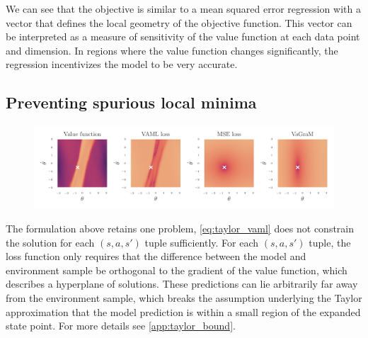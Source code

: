 We can see that the objective is similar to a mean squared error regression with a vector that defines the local geometry of the objective function. This vector can be interpreted as a measure of sensitivity of the value function at each data point and dimension. In regions where the value function changes significantly, the regression incentivizes the model to be very accurate. 

\subsection{Preventing spurious local minima}
\begin{figure}[!t]
\centering
    \includegraphics[clip, trim=0.cm 0.5cm 0.cm 0.45cm, width=\textwidth]{figures/vagram/all_losses.pdf}
    \caption{}
    \label{fig:all_losses}
\end{figure}


The formulation above retains one problem, \autoref{eq:taylor_vaml} does not constrain the solution for each $(s,a,s')$ tuple sufficiently.
For each $(s,a,s')$ tuple, the loss function only requires that the difference between the model and environment sample be orthogonal to the gradient of the value function, which describes a hyperplane of solutions.
These predictions can lie arbitrarily far away from the environment sample, which breaks the assumption underlying the Taylor approximation that the model prediction is within a small region of the expanded state point.
For more details see \autoref{app:taylor_bound}.

